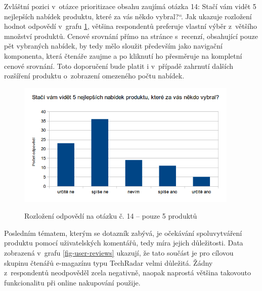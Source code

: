 \documentclass[12pt,twoside,openany]{fithesis}
\begin{document}
            Zvláštní pozici v~otázce prioritizace obsahu zaujímá otázka 
14: \glqq Stačí vám vidět 5 nejlepších nabídek produktu, které za vás 
někdo vybral?\textquotedblleft{}. Jak ukazuje rozložení hodnot odpovědí 
v~grafu \hyperlink{fig-top-5}{{\ref{fig-top-5}}}, většina respondentů 
preferuje vlastní výběr z~většího množství produktů. Cenové 
srovnání přímo na stránce s~recenzí, obsahující pouze pět vybraných 
nabídek, by tedy mělo sloužit především jako navigační komponenta, 
která čtenáře zaujme a po kliknutí ho přesměruje na kompletní cenové 
srovnání. Toto doporučení bude platit i v~případě zahrnutí dalších 
rozšíření produktu o~zobrazení omezeného počtu nabídek.

            \begin{figure}[hbt]
                \hypertarget{fig-top-5}{}%
                \begin{center}

                    
{{\includegraphics[width=400px]{img/top-5}}\hypertarget{idp55050896}{}%
                        \label{idp55050896}
                    }
                    {{\caption[{Rozložení odpovědí na otázku č. 14 -- 
pouze 5 produktů}]{{{Rozložení odpovědí na otázku č. 14 -- pouze 5 
produktů}}}\label{fig-top-5}}}
                \end{center}
            \end{figure}

            Posledním tématem, kterým se dotazník zabývá, je 
očekávání spoluvytváření produktu pomocí uživatelských komentářů, 
tedy míra jejich důležitosti. Data zobrazená v~grafu 
\hyperlink{fig-user-reviews}{{\ref{fig-user-reviews}}} ukazují, že tato 
součást je pro cílovou skupinu čtenářů e-magazínu typu TechRadar velmi 
důležitá. Žádny z~respondentů neodpověděl zcela negativně, naopak 
naprostá většina takovouto funkcionalitu při online nakupování použije.
\end{document}
